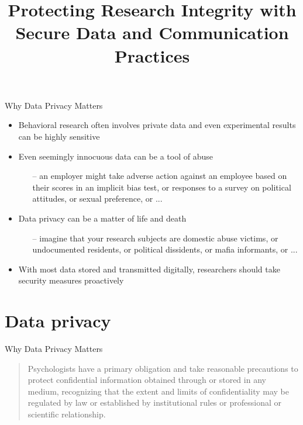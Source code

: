 \documentclass[aspectratio=169]{beamer}
\title{Protecting Research Integrity with Secure Data and Communication Practices}
\date{}
\begin{document}
\begin{frame}
  \titlepage
\end{frame}


\begin{frame}{Why Data Privacy Matters}
\pause
  \begin{itemize}
    \item Behavioral research often involves private data and even experimental results can be highly sensitive
    \item Even seemingly innocuous data can be a tool of abuse
    \begin{itemize}
      \item[--] an employer might take adverse action against an employee based on their scores in an implicit bias test, or responses to a survey on political attitudes, or sexual preference, or ...
    \end{itemize}
    \item Data privacy can be a matter of life and death
    \begin{itemize}
      \item[--] imagine that your research subjects are domestic abuse victims, or undocumented residents, or political dissidents, or mafia informants, or ...
    \end{itemize}
    \item With most data stored and transmitted digitally, researchers should take security measures proactively
  \end{itemize}

\end{frame}


\section{Data privacy}

\begin{frame}{Why Data Privacy Matters}
\begin{quote}
Psychologists have a primary obligation and take reasonable precautions to protect confidential information obtained through or stored in any medium, recognizing that the extent and limits of confidentiality may be regulated by law or established by institutional rules or professional or scientific relationship.
\end{quote}
\end{frame}
\end{document}
